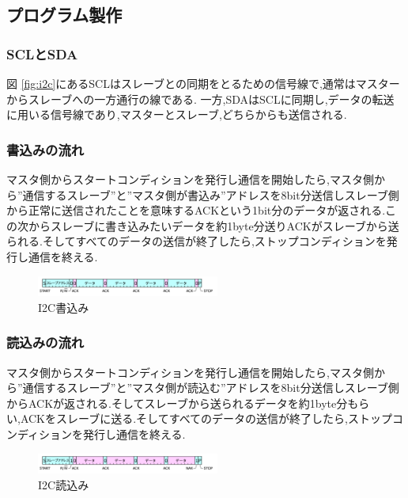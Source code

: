 \documentclass[twocolumn,11pt]{abst}
\begin{document}
\subsection{プログラム製作}

\subsubsection{SCLとSDA}
図 \ref{fig:i2c}にあるSCLはスレーブとの同期をとるための信号線で,通常はマスターからスレーブへの一方通行の線である.
一方,SDAはSCLに同期し,データの転送に用いる信号線であり,マスターとスレーブ,どちらからも送信される.

\subsubsection{書込みの流れ}

マスタ側からスタートコンディションを発行し通信を開始したら,マスタ側から''通信するスレーブ''と''マスタ側が書込み''アドレスを8bit分送信しスレーブ側から正常に送信されたことを意味するACKという1bit分のデータが返される.この次からスレーブに書き込みたいデータを約1byte分送りACKがスレーブから送られる.そしてすべてのデータの送信が終了したら,ストップコンディションを発行し通信を終える.

\begin{figure}[htbp]
  \begin{center}
    \includegraphics[width=60mm]{i2c_w.png}
    \end{center}
  \caption{I2C書込み}
 \label{fig:i2c_w}
\end{figure}

\subsubsection{読込みの流れ}

マスタ側からスタートコンディションを発行し通信を開始したら,マスタ側から''通信するスレーブ''と''マスタ側が読込む''アドレスを8bit分送信しスレーブ側からACKが返される.そしてスレーブから送られるデータを約1byte分もらい,ACKをスレーブに送る.そしてすべてのデータの送信が終了したら,ストップコンディションを発行し通信を終える.

\begin{figure}[htbp]
  \begin{center}
    \includegraphics[width=60mm]{i2c_r.png}
    \end{center}
  \caption{I2C読込み}
 \label{fig:i2c_r}
\end{figure}
\end{document}
